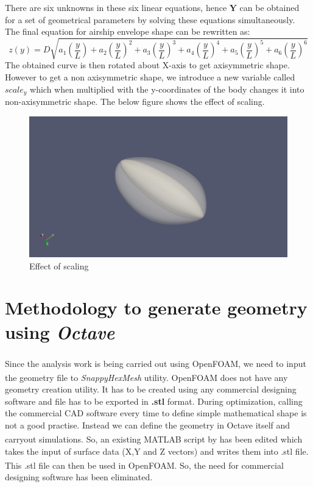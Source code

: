 There are six unknowns in these six linear equations, hence $\bm{Y}$ can be obtained for a set of geometrical parameters by solving these equations simultaneously. The final equation for airship envelope shape can be rewritten as:
\begin{equation}
\label{eq28}
z(y) = D\sqrt{a_1\left(\dfrac{y}{L}\right) + a_2\left(\dfrac{y}{L}\right)^2 + a_3\left(\dfrac{y}{L}\right)^3 + a_4\left(\dfrac{y}{L}\right)^4 + a_5\left(\dfrac{y}{L}\right)^5 +  a_6\left(\dfrac{y}{L}\right)^6}	
\end{equation}
The obtained curve is then rotated about X-axis to get axisymmetric shape. However to get a non axisymmetric shape, we introduce a new variable called $ scale_y $ which when multiplied with the y-coordinates of the body changes it into non-axisymmetric shape. The below figure shows the effect of scaling.
\begin{figure}[htbp]
	\centering
	\includegraphics[width=200 pt]{rnd/effect_of_scaling.png}
	\caption{Effect of scaling }
	\label{Effect of scaling}
\end{figure}


\section{Methodology to generate geometry using \textit{Octave}}

Since the analysis work is being carried out using OpenFOAM\textsuperscript{\textregistered}, we need to input the geometry file to \textit{SnappyHexMesh} utility. OpenFOAM\textsuperscript{\textregistered} does not have any geometry creation utility. It has to be created using any commercial designing software and file has to be exported in \textbf{.stl} format. During optimization, calling the commercial CAD software every time to define simple mathematical shape is not a good practise. Instead we can define the geometry in Octave itself and carryout simulations. So, an existing MATLAB\textsuperscript{\textregistered} script by \cite{BillMcDonald} has been edited which takes the input of surface data  (X,Y and Z vectors) and writes them into .stl file. This .stl file can then be used in OpenFOAM\textsuperscript{\textregistered}. So, the need for commercial designing software has been eliminated.
